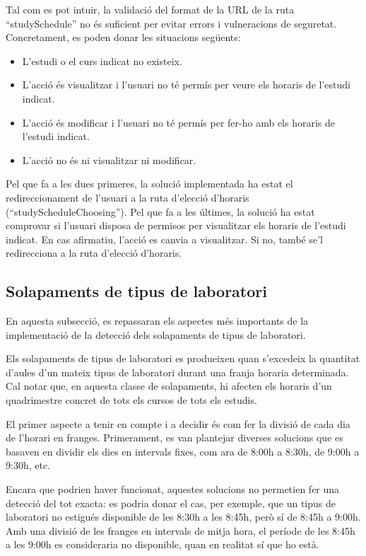 \documentclass[a4paper,12pt]{ThesisStyle}
\begin{document}
Tal com es pot intuir, la validació del format de la URL de la ruta ``studySchedule'' no és suficient per evitar errors i vulneracions de seguretat. Concretament, es poden donar les situacions següents:
\begin{itemize}
  \item L'estudi o el curs indicat no existeix.
  \item L'acció és visualitzar i l'usuari no té permís per veure els horaris de l'estudi indicat.
  \item L'acció és modificar i l'usuari no té permís per fer-ho amb els horaris de l'estudi indicat.
  \item L'acció no és ni visualitzar ni modificar.
\end{itemize}

Pel que fa a les dues primeres, la solució implementada ha estat el redireccionament de l'usuari a la ruta d'elecció d'horaris (``studyScheduleChoosing''). Pel que fa a les últimes, la solució ha estat comprovar si l'usuari disposa de permisos per visualitzar els horaris de l'estudi indicat. En cas afirmatiu, l'acció es canvia a visualitzar. Si no, també se'l redirecciona a la ruta d'elecció d'horaris.

\subsection{Solapaments de tipus de laboratori}
\label{subsec:solapaments_lab}

En aquesta subsecció, es repassaran els aspectes més importants de la implementació de la detecció dels solapaments de tipus de laboratori.

Els solapaments de tipus de laboratori es produeixen quan s'excedeix la quantitat d'aules d'un mateix tipus de laboratori durant una franja horaria determinada. Cal notar que, en aquesta classe de solapaments, hi afecten els horaris d'un quadrimestre concret de tots els cursos de tots els estudis.

El primer aspecte a tenir en compte i a decidir és com fer la divisió de cada dia de l'horari en franges. Primerament, es van plantejar diverses solucions que es basaven en dividir els dies en intervals fixes, com ara de 8:00h a 8:30h, de 9:00h a 9:30h, etc.

Encara que podrien haver funcionat, aquestes solucions no permetien fer una detecció del tot exacta: es podria donar el cas, per exemple, que un tipus de laboratori no estigués disponible de les 8:30h a les 8:45h, però sí de 8:45h a 9:00h. Amb una divisió de les franges en intervals de mitja hora, el període de les 8:45h a les 9:00h es consideraria no disponible, quan en realitat sí que ho està.
\end{document}
